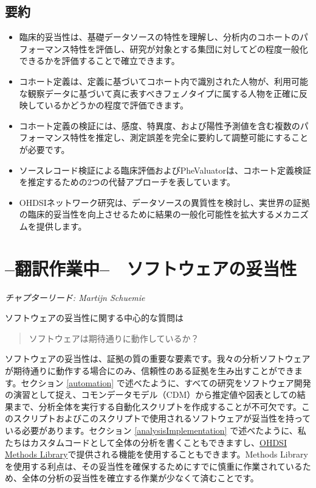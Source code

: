 \documentclass[
  11pt]{book}
\makeatletter
\providecommand{\tightlist}{%
  \setlength{\itemsep}{0pt}\setlength{\parskip}{0pt}}
\newenvironment{kframe}{%
\medskip{}
\setlength{\fboxsep}{.8em}
 \def\at@end@of@kframe{}%
 \ifinner\ifhmode%
  \def\at@end@of@kframe{\end{minipage}}%
  \begin{minipage}{\columnwidth}%
 \fi\fi%
 \def\FrameCommand##1{\hskip\@totalleftmargin \hskip-\fboxsep
 \colorbox{myShadeColor}{##1}\hskip-\fboxsep
     \hskip-\linewidth \hskip-\@totalleftmargin \hskip\columnwidth}%
 \MakeFramed {\advance\hsize-\width
   \@totalleftmargin\z@ \linewidth\hsize
   \@setminipage}}%
 {\par\unskip\endMakeFramed%
 \at@end@of@kframe}
\newenvironment{rmdblock}[1]
  {
  \begin{itemize}
  \renewcommand{\labelitemi}{
    \raisebox{-.7\height}[0pt][0pt]{
      {\setkeys{Gin}{width=3em,keepaspectratio}\texttt{[image: images/\#1]}}
    }
  }
  \setlength{\fboxsep}{1em}
  \begin{kframe}
  \item
  }
  {
  \end{kframe}
  \end{itemize}
  }
\newenvironment{rmdsummary}
  {\begin{rmdblock}{summary}}
  {\end{rmdblock}}
\theoremstyle{definition}
\theoremstyle{definition}
\theoremstyle{definition}
\theoremstyle{definition}
\theoremstyle{remark}
\makeatother
\begin{document}
\section{要約}\label{ux8981ux7d04}

\begin{rmdsummary}
\begin{itemize}
\tightlist
\item
  臨床的妥当性は、基礎データソースの特性を理解し、分析内のコホートのパフォーマンス特性を評価し、研究が対象とする集団に対してどの程度一般化できるかを評価することで確立できます。
\item
  コホート定義は、定義に基づいてコホート内で識別された人物が、利用可能な観察データに基づいて真に表すべきフェノタイプに属する人物を正確に反映しているかどうかの程度で評価できます。
\item
  コホート定義の検証には、感度、特異度、および陽性予測値を含む複数のパフォーマンス特性を推定し、測定誤差を完全に要約して調整可能にすることが必要です。
\item
  ソースレコード検証による臨床評価およびPheValuatorは、コホート定義検証を推定するための2つの代替アプローチを表しています。
\item
  OHDSIネットワーク研究は、データソースの異質性を検討し、実世界の証拠の臨床的妥当性を向上させるために結果の一般化可能性を拡大するメカニズムを提供します。
\end{itemize}
\end{rmdsummary}

\chapter{--翻訳作業中--　ソフトウェアの妥当性}\label{SoftwareValidity}

\emph{チャプターリード: Martijn Schuemie}

ソフトウェアの妥当性に関する中心的な質問は

\begin{quote}
ソフトウェアは期待通りに動作しているか？
\end{quote}

ソフトウェアの妥当性は、証拠の質の重要な要素です。我々の分析ソフトウェアが期待通りに動作する場合にのみ、信頼性のある証拠を生み出すことができます。セクション \ref{automation} で述べたように、すべての研究をソフトウェア開発の演習として捉え、コモンデータモデル（CDM）から推定値や図表としての結果まで、分析全体を実行する自動化スクリプトを作成することが不可欠です。このスクリプトおよびこのスクリプトで使用されるソフトウェアが妥当性を持っている必要があります。セクション \ref{analysisImplementation} で述べたように、私たちはカスタムコードとして全体の分析を書くこともできますし、\href{https://ohdsi.github.io/MethodsLibrary/}{OHDSI Methods Library}で提供される機能を使用することもできます。Methods Libraryを使用する利点は、その妥当性を確保するためにすでに慎重に作業されているため、全体の分析の妥当性を確立する作業が少なくて済むことです。  
\end{document}
